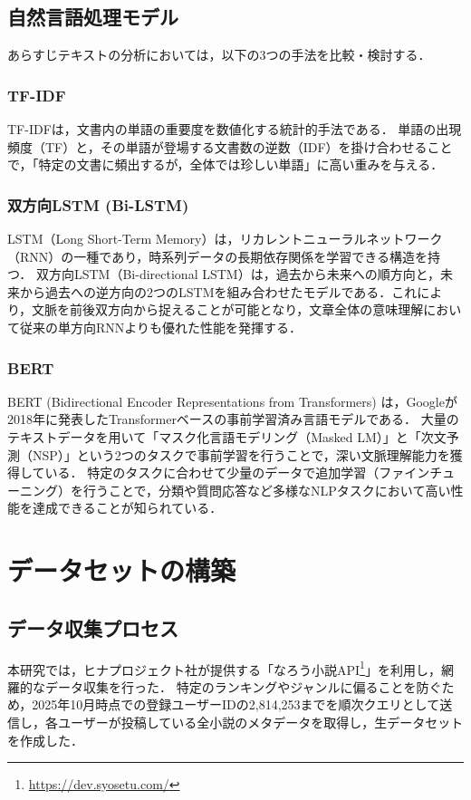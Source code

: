 \documentclass[uplatex, dvipdfmx, 11pt, a4paper, report]{jsbook}
\begin{document}
\subsection{自然言語処理モデル}
あらすじテキストの分析においては，以下の3つの手法を比較・検討する．

\subsubsection*{TF-IDF}
TF-IDFは，文書内の単語の重要度を数値化する統計的手法である．
単語の出現頻度（TF）と，その単語が登場する文書数の逆数（IDF）を掛け合わせることで，「特定の文書に頻出するが，全体では珍しい単語」に高い重みを与える．

\subsubsection*{双方向LSTM (Bi-LSTM)}
LSTM（Long Short-Term Memory）は，リカレントニューラルネットワーク（RNN）の一種であり，時系列データの長期依存関係を学習できる構造を持つ\cite{lstm}．
双方向LSTM（Bi-directional LSTM）は，過去から未来への順方向と，未来から過去への逆方向の2つのLSTMを組み合わせたモデルである．これにより，文脈を前後双方向から捉えることが可能となり，文章全体の意味理解において従来の単方向RNNよりも優れた性能を発揮する．

\subsubsection*{BERT}
BERT (Bidirectional Encoder Representations from Transformers) は，Googleが2018年に発表したTransformerベースの事前学習済み言語モデルである\cite{bert}．
大量のテキストデータを用いて「マスク化言語モデリング（Masked LM）」と「次文予測（NSP）」という2つのタスクで事前学習を行うことで，深い文脈理解能力を獲得している．
特定のタスクに合わせて少量のデータで追加学習（ファインチューニング）を行うことで，分類や質問応答など多様なNLPタスクにおいて高い性能を達成できることが知られている．

\section{データセットの構築}

\subsection{データ収集プロセス}
本研究では，ヒナプロジェクト社が提供する「なろう小説API\footnote{\url{https://dev.syosetu.com/}}」を利用し，網羅的なデータ収集を行った．
特定のランキングやジャンルに偏ることを防ぐため，2025年10月時点での登録ユーザーIDの2,814,253までを順次クエリとして送信し，各ユーザーが投稿している全小説のメタデータを取得し，生データセットを作成した．
\end{document}
